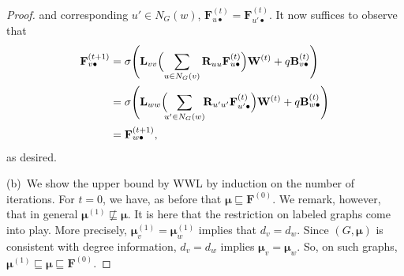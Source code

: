 \begin{proof}
   and corresponding $u'\in N_G(w)$, $\mathbf{F}^{(t)}_{u\bullet}=\mathbf{F}^{(t)}_{u'\bullet}$. It now suffices to observe that
  \begin{align*}
  \mathbf{F}^{(t+1)}_{v\bullet}&=\sigma\Biggl(\mathbf{L}_{vv}\Bigl(\sum_{u\in N_G(v)} \mathbf{R}_{uu}\mathbf{F}^{(t)}_{u\bullet}\Bigr)\mathbf{W}^{(t)}+ q\mathbf{B}^{(t)}_{v\bullet}\Biggr)\\
	 & =\sigma\Biggl(\mathbf{L}_{ww}\Bigl(\!\!\sum_{u'\in N_G(w)}\!\! \mathbf{R}_{u'u'}\mathbf{F}^{(t)}_{u'\bullet}\Bigr)\mathbf{W}^{(t)}+ q\mathbf{B}^{(t)}_{w\bullet}\Biggr)\\
	  &=\mathbf{F}^{(t+1)}_{w\bullet},
\end{align*}
as desired.


(b)~We show the upper bound by WWL by induction on the number of iterations. For $t=0$, we have, as before that $\pmb{\mu}\sqsubseteq \mathbf{F}^{(0)}$. 
We remark, however, that in general $\pmb{\mu}^{(1)}\not\sqsubseteq\pmb{\mu}$.
It is here that the restriction on labeled graphs come into play. More precisely,
$\pmb{\mu}^{(1)}_v=\pmb{\mu}^{(1)}_w$ implies that $d_v=d_w$. Since $(G,\pmb{\mu})$ is consistent with degree information, $d_v=d_w$ implies
$\pmb{\mu}_v=\pmb{\mu}_w$. So, on such graphs, $\pmb{\mu}^{(1)}\sqsubseteq\pmb{\mu}\sqsubseteq\mathbf{F}^{(0)}$.


\end{proof}
